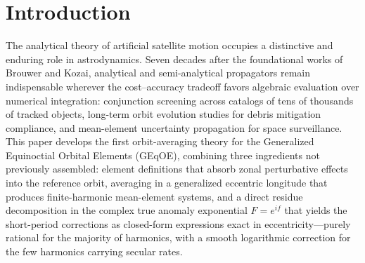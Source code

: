 \section{Introduction}
\label{sec:intro}

The analytical theory of artificial satellite motion occupies a distinctive
and enduring role in astrodynamics.  Seven decades after the foundational
works of Brouwer and Kozai, analytical and semi-analytical propagators
remain indispensable wherever the cost--accuracy tradeoff favors algebraic
evaluation over numerical integration: conjunction screening across catalogs
of tens of thousands of tracked objects, long-term orbit evolution studies
for debris mitigation compliance, and mean-element uncertainty propagation
for space surveillance.  This paper develops the first orbit-averaging theory for the Generalized
Equinoctial Orbital Elements (GEqOE), combining three ingredients not
previously assembled: element definitions that absorb zonal perturbative
effects into the reference orbit, averaging in a generalized eccentric
longitude that produces finite-harmonic mean-element systems, and a direct
residue decomposition in the complex true anomaly exponential $F = e^{if}$
that yields the short-period corrections as closed-form expressions exact
in eccentricity---purely rational for the majority of harmonics, with a
smooth logarithmic correction for the few harmonics carrying secular rates.

